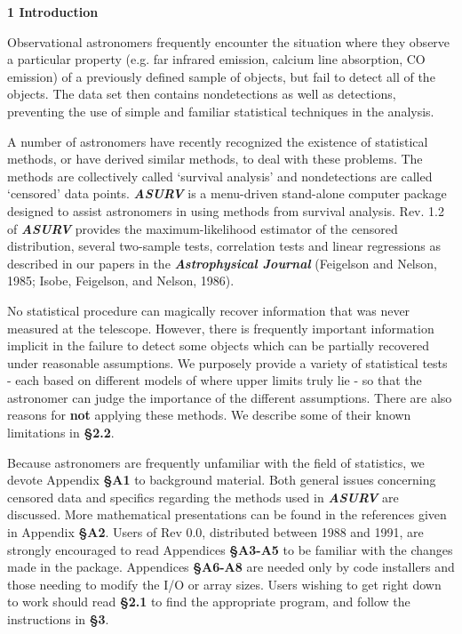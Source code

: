 \newpage

\centerline{\Large\bf 1  Introduction} 

    Observational astronomers frequently encounter the situation where they 
observe a particular property (e.g. far infrared emission, calcium line 
absorption, CO emission) of a previously defined sample of objects, but 
fail to detect all of the objects.  The data set then contains nondetections as 
well as detections, preventing the use of simple and familiar statistical 
techniques in the analysis.   
 
     A number of astronomers have recently recognized the existence 
of statistical methods, or have derived similar methods, to deal with these 
problems.  The methods are collectively
called `survival analysis' and nondetections are called 
`censored' data points.  {\sl\bf ASURV} is a menu-driven stand-alone computer
package designed  to assist astronomers in using methods from survival 
analysis.  Rev. 1.2 of {\sl\bf ASURV}  provides the maximum-likelihood
estimator of the censored distribution,
several two-sample tests, correlation tests and linear regressions  as
described in our papers in the {\it\bf Astrophysical Journal} (Feigelson 
and Nelson, 1985; Isobe, Feigelson, and Nelson, 1986). 

     No statistical procedure can magically recover information that was
never measured at the telescope.  However, there is frequently important 
information implicit in the failure to detect some objects which can be
partially recovered under reasonable assumptions. We purposely provide 
a variety of statistical tests - each 
based on different models of where  upper limits truly lie - so that the
astronomer can judge the importance of the different assumptions.  
There are also reasons for {\bf not} applying these methods.  We describe
some of their known limitations in {\bf \S  2.2}.

     Because astronomers are frequently unfamiliar with the field of 
statistics, we devote Appendix {\bf  \S A1} to background 
material.  Both general issues concerning censored data and specifics 
regarding the methods used in {\sl\bf ASURV} are discussed.  More 
mathematical presentations can be found in the references given in Appendix
{\bf \S A2}. Users of Rev 0.0, distributed between 1988 and 1991,  are 
strongly encouraged to 
read Appendices {\bf \S A3-A5} to be familiar with the changes made in the 
package.  Appendices {\bf \S A6-A8} are needed only by code installers and
those needing to modify the I/O or array sizes.  
Users wishing to get right down to work should read  {\bf \S 2.1} to
find the appropriate program, and follow  the instructions in {\bf \S 3}. 

